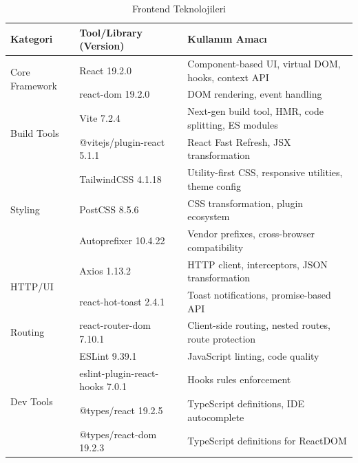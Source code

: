 \documentclass[a4paper,12pt]{report}
\begin{document}
\begin{table}[h]
\centering
\tiny
\begin{tabular}{|l|l|p{9cm}|}
\hline
\textbf{Kategori} & \textbf{Tool/Library (Version)} & \textbf{Kullanım Amacı} \\ \hline
\multirow{2}{*}{Core Framework}
& React 19.2.0 & Component-based UI, virtual DOM, hooks, context API \\ \cline{2-3}
& react-dom 19.2.0 & DOM rendering, event handling \\ \hline
\multirow{2}{*}{Build Tools}
& Vite 7.2.4 & Next-gen build tool, HMR, code splitting, ES modules \\ \cline{2-3}
& @vitejs/plugin-react 5.1.1 & React Fast Refresh, JSX transformation \\ \hline
\multirow{3}{*}{Styling}
& TailwindCSS 4.1.18 & Utility-first CSS, responsive utilities, theme config \\ \cline{2-3}
& PostCSS 8.5.6 & CSS transformation, plugin ecosystem \\ \cline{2-3}
& Autoprefixer 10.4.22 & Vendor prefixes, cross-browser compatibility \\ \hline
\multirow{2}{*}{HTTP/UI}
& Axios 1.13.2 & HTTP client, interceptors, JSON transformation \\ \cline{2-3}
& react-hot-toast 2.4.1 & Toast notifications, promise-based API \\ \hline
Routing & react-router-dom 7.10.1 & Client-side routing, nested routes, route protection \\ \hline
\multirow{4}{*}{Dev Tools}
& ESLint 9.39.1 & JavaScript linting, code quality \\ \cline{2-3}
& eslint-plugin-react-hooks 7.0.1 & Hooks rules enforcement \\ \cline{2-3}
& @types/react 19.2.5 & TypeScript definitions, IDE autocomplete \\ \cline{2-3}
& @types/react-dom 19.2.3 & TypeScript definitions for ReactDOM \\ \hline
\end{tabular}
\caption{Frontend Teknolojileri}
\end{table}
\end{document}
